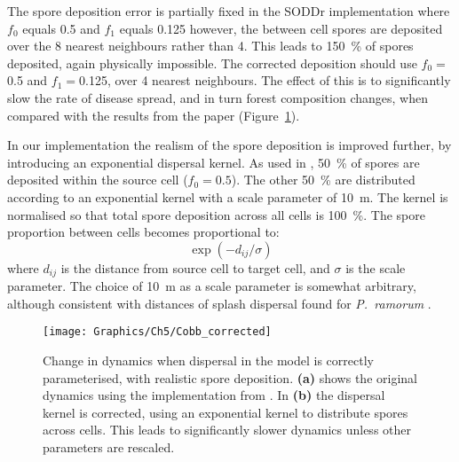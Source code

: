 The spore deposition error is partially fixed in the SODDr implementation where $f_0$ equals 0.5 and $f_1$ equals \num{0.125} however, the between cell spores are deposited over the 8 nearest neighbours rather than 4. This leads to \SI{150}{\percent} of spores deposited, again physically impossible. The corrected deposition should use $f_0=$\num{0.5} and $f_1=$\num{0.125}, over 4 nearest neighbours. The effect of this is to significantly slow the rate of disease spread, and in turn forest composition changes, when compared with the results from the paper (Figure~\ref{fig:ch5:cobb_spatial_rate}).

In our implementation the realism of the spore deposition is improved further, by introducing an exponential dispersal kernel. As used in \citet{cobb_ecosystem_2012} , \SI{50}{\percent} of spores are deposited within the source cell ($f_0=\num{0.5}$). The other \SI{50}{\percent} are distributed according to an exponential kernel with a scale parameter of \SI{10}{\meter}. The kernel is normalised so that total spore deposition across all cells is \SI{100}{\percent}. The spore proportion between cells becomes proportional to:
\begin{equation}\label{eqn:ch5:spore_kernel}
    \exp{\left(-d_{ij}/\sigma\right)}
\end{equation}
where $d_{ij}$ is the distance from source cell to target cell, and $\sigma$ is the scale parameter. The choice of \SI{10}{\meter} as a scale parameter is somewhat arbitrary, although consistent with distances of splash dispersal found for \emph{P.~ramorum} \citep{davidson_transmission_2005}. 

\begin{figure}[t]
    \begin{center}
        \texttt{[image: Graphics/Ch5/Cobb\_corrected]}
        \caption[Change in model dynamics under corrected parameters]{Change in dynamics when dispersal in the model is correctly parameterised, with realistic spore deposition. \textbf{(a)} shows the original dynamics using the implementation from \citet{cobb_ecosystem_2012}. In \textbf{(b)} the dispersal kernel is corrected, using an exponential kernel to distribute spores across cells. This leads to significantly slower dynamics unless other parameters are rescaled.\label{fig:ch5:cobb_spatial_rate} }
    \end{center}
\end{figure}

